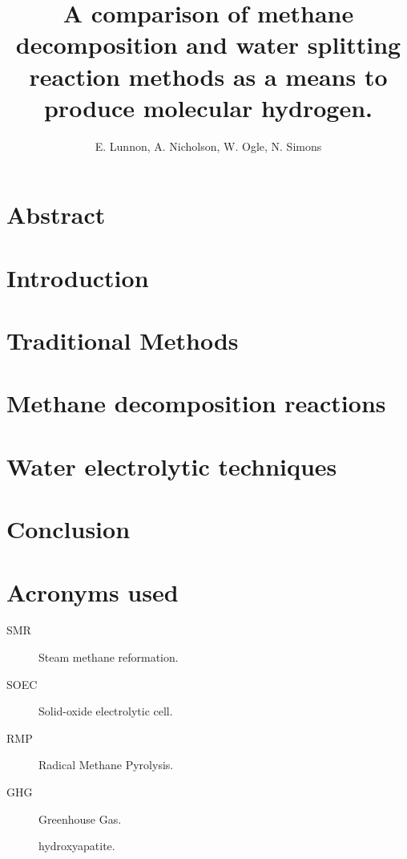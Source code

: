 \documentclass[a4paper]{article}
\title{A comparison of methane decomposition and water splitting reaction methods as a means to produce molecular hydrogen.}
\author{E. Lunnon, A. Nicholson, W. Ogle, N. Simons}
\begin{document}
\maketitle
\tableofcontents
\clearpage

\section*{Abstract}%
\label{sec:abstract}



\begin{multicols}{2}
\section{Introduction}%
\label{sec:introduction}


\section{Traditional Methods}%
\label{sub:Traditional_Methods}


\section{Methane decomposition reactions}%
\label{sub:ch4_methods}


\section{Water electrolytic techniques}%
\label{sub:h2o_methods}


\section{Conclusion}%
\label{sec:conclusion}


\section{Acronyms used}%
\label{sec:acronyms_used}

\begin{description}
	\item[SMR] Steam methane reformation.
	\item[SOEC] Solid-oxide electrolytic cell.
	\item[RMP] Radical Methane Pyrolysis.
	\item[GHG] Greenhouse Gas.
	\item[] hydroxyapatite. 
\end{description}

%



\end{multicols}
\end{document}
